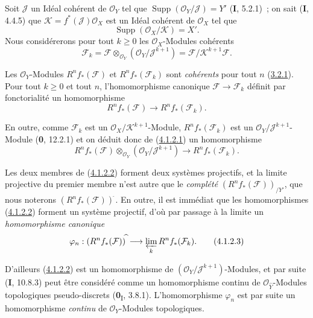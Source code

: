 \begin{env}[4.1.2]
\label{III.4.1.2-fr}
Soit $\mathcal J$ un Idéal cohérent de $\mathcal O_Y$ tel que
$\operatorname{Supp}(\mathcal O_Y/\mathcal J)=Y'$ (\textbf{I}, 5.2.1)~; on sait
(\textbf{I}, 4.4.5) que
$\mathcal K=f^*(\mathcal J)\mathcal O_X$
est un Idéal cohérent de $\mathcal O_X$ tel que
\[
\operatorname{Supp}(\mathcal O_X/\mathcal K)=X'.
\]
Nous considérerons pour tout $k\geq0$ les $\mathcal O_X$-Modules cohérents
\[
\mathcal F_k
=\mathcal F\otimes_{\mathcal O_Y}(\mathcal O_Y/\mathcal J^{k+1})
=\mathcal F/\mathcal K^{k+1}\mathcal F.
\]

Les $\mathcal O_Y$-Modules $R^nf_*(\mathcal F)$ et
$R^nf_*(\mathcal F_k)$ sont \emph{cohérents} pour tout $n$
(\hyperref[III.3.2.1-fr]{3.2.1}). Pour tout $k\geq0$ et tout $n$,
l'homomorphisme canonique $\mathcal F\to\mathcal F_k$ définit par
fonctorialité un homomorphisme
\[
R^nf_*(\mathcal F)\longrightarrow R^nf_*(\mathcal F_k).
\tag{4.1.2.1}\label{III.4.1.2.1-fr}
\]

En outre, comme $\mathcal F_k$ est un
$\mathcal O_X/\mathcal K^{k+1}$-Module, $R^nf_*(\mathcal F_k)$ est un
$\mathcal O_Y/\mathcal J^{k+1}$-Module (\textbf{0}, 12.2.1) et on déduit donc de
(\hyperref[III.4.1.2.1-fr]{4.1.2.1}) un homomorphisme
\[
R^nf_*(\mathcal F)\otimes_{\mathcal O_Y}
(\mathcal O_Y/\mathcal J^{k+1})
\longrightarrow R^nf_*(\mathcal F_k).
\tag{4.1.2.2}\label{III.4.1.2.2-fr}
\]

Les deux membres de (\hyperref[III.4.1.2.2-fr]{4.1.2.2}) forment deux
systèmes projectifs, et la limite projective du premier membre n'est autre
que le \emph{complété} $(R^nf_*(\mathcal F))_{/Y'}$, que nous noterons
$(R^nf_*(\mathcal F))^{\widehat{\,}}$. En outre, il est immédiat que les
homomorphismes (\hyperref[III.4.1.2.2-fr]{4.1.2.2}) forment un système
projectif, d'où par passage à la limite un \emph{homomorphisme canonique}
\[
\varphi_n:(R^nf_*(\mathcal F))^{\widehat{\,}}
\longrightarrow\varprojlim_kR^nf_*(\mathcal F_k).
\tag{4.1.2.3}\label{III.4.1.2.3-fr}
\]

D'ailleurs (\hyperref[III.4.1.2.2-fr]{4.1.2.2}) est un homomorphisme de
$(\mathcal O_Y/\mathcal J^{k+1})$-Modules, et par suite (\textbf{I}, 10.8.3) peut
être considéré comme un homomorphisme continu de
$\mathcal O_{\widehat Y}$-Modules topologiques pseudo-discrets
(\textbf{0}\textsubscript{I}, 3.8.1). L'homomorphisme $\varphi_n$ est par suite un
homomorphisme \emph{continu} de $\mathcal O_Y$-Modules topologiques.
\end{env}

